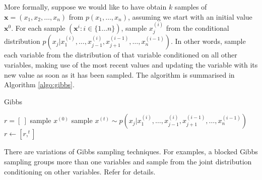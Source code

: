 More formally, suppose we would like to have obtain $k$ samples of $\mathbf{x}=(x_1,x_2,\ldots, x_n)$ from $p(x_1, \ldots, x_n)$, assuming we start with an initial value $\mathbf{x}^{0}$. For each sample $(\mathbf{x}^{i}: i \in \{1 \dots n\})$, sample $x_j^{(i)}$ from the conditional distribution $p(x_j|x_1^{(i)},\dots,x_{j-1}^{(i)},x_{j+1}^{(i-1)},\dots,x_n^{(i-1)})$. In other words, sample each variable from the distribution of that variable conditioned on all other variables, making use of the most recent values and updating the variable with its new value as soon as it has been sampled. The algorithm is summarised in Algorithm \ref{algo:gibbs}.

\begin{algorithm}
\caption{Gibbs}\label{algo:gibbs}
\begin{algorithmic}[1]
\State $r = [\ ]$
\State sample $x^{(0)}$
\Repeat
  \State sample $x^{(t)} \sim p(x_j|x_1^{(i)},\dots,x_{j-1}^{(i)},x_{j+1}^{(i-1)},\dots,x_n^{(i-1)})$
  \State $r \gets [r,^{t}]$
\EndFunction
\end{algorithmic}
\end{algorithm}

There are variations of Gibbs sampling techniques. For examples, a blocked Gibbs sampling groups more than one variables and sample from the joint distribution conditioning on other variables. Refer \cite{RCP05} for details. 




